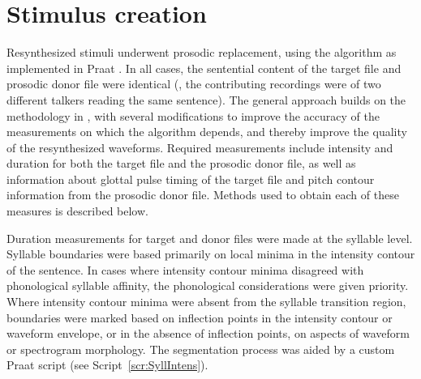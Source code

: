 \section{Stimulus creation\label{sec:StimDesign}}
Resynthesized stimuli underwent prosodic replacement, using the \psola{} algorithm as implemented in Praat \citep{praat}.  In all cases, the sentential content of the target file and prosodic donor file were identical (\ie, the contributing recordings were of two different talkers reading the same sentence).  The general approach builds on the methodology in \citet{Yoon2007}, with several modifications to improve the accuracy of the measurements on which the algorithm depends, and thereby improve the quality of the resynthesized waveforms.  Required measurements include intensity and duration for both the target file and the prosodic donor file, as well as information about glottal pulse timing of the target file and pitch contour information from the prosodic donor file.  Methods used to obtain each of these measures is described below.  


Duration measurements for target and donor files were made at the syllable level.  Syllable boundaries were based primarily on local minima in the intensity contour of the sentence.  In cases where intensity contour minima disagreed with phonological syllable affinity, the phonological considerations were given priority.\footnotemark{}  Where intensity contour minima were absent from the syllable transition region, boundaries were marked based on inflection points in the intensity contour or waveform envelope, or in the absence of inflection points, on aspects of waveform or spectrogram morphology.  The segmentation process was aided by a custom Praat script (see Script~\ref{scr:SyllIntens}).

